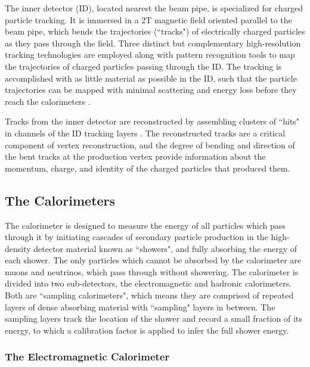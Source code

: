 The inner detector (ID), located nearest the beam pipe, is specialized for charged particle tracking. It is immersed in a 2T magnetic field oriented parallel to the beam pipe, which bends the trajectories (``tracks") of electrically charged particles as they pass through the field. Three distinct but complementary high-resolution tracking technologies are employed along with pattern recognition tools to map the trajectories of charged particles passing through the ID. The tracking is accomplished with as little material as possible in the ID, such that the particle trajectories can be mapped with minimal scattering and energy loss before they reach the calorimeters \cite{id_thesis}. 

Tracks from the inner detector are reconstructed by assembling clusters of ``hits" in channels of the ID tracking layers \cite{electron_reco}. The reconstructed tracks are a critical component of vertex reconstruction, and the degree of bending and direction of the bent tracks at the production vertex provide information about the momentum, charge, and identity of the charged particles that produced them. 


\subsection{The Calorimeters}

The calorimeter is designed to measure the energy of all particles which pass through it by initiating cascades of secondary particle production in the high-density detector material known as ``showers", and fully absorbing the energy of each shower. The only particles which cannot be absorbed by the calorimeter are muons and neutrinos, which pass through without showering. The calorimeter is divided into two sub-detectors, the electromagnetic and hadronic calorimeters. Both are ``sampling calorimeters", which means they are comprised of repeated layers of dense absorbing material with ``sampling" layers in between. The sampling layers track the location of the shower and record a small fraction of its energy, to which a calibration factor is applied to infer the full shower energy. 

\subsubsection{The Electromagnetic Calorimeter}
\label{sec:EM_calo}

